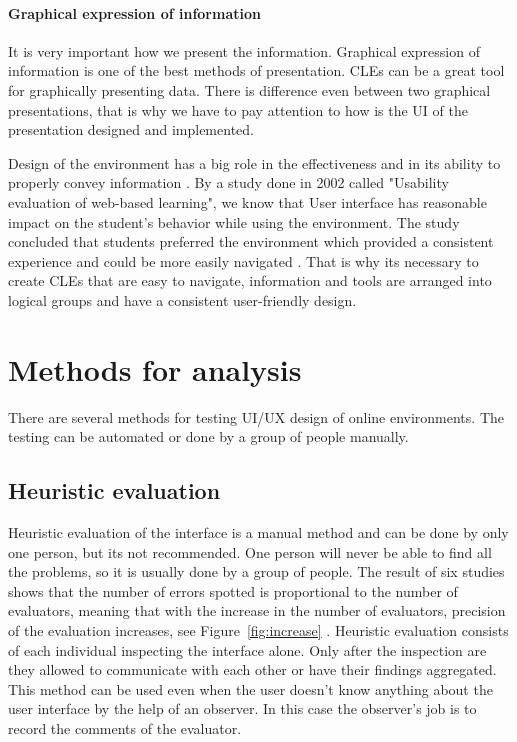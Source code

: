 \documentclass[10pt,english,a4paper]{article}
\begin{document}
\paragraph{Graphical expression of information}
It is very important how we present the information. Graphical expression of information is one of the best methods of presentation. CLEs can be
a great tool for graphically presenting data. There is difference even between two graphical presentations,
that is why we have to pay attention to how is the UI of the presentation designed and implemented. 


Design of the environment has a big role in the effectiveness and in 
its ability to properly convey information \cite{ui/ux}. 
By a study done in 2002 called "Usability evaluation of web-based learning", we know that User interface
has reasonable impact on the student's behavior while using the environment\cite{wesson_2002_usability}.
The study concluded that students preferred the environment which provided a consistent experience and could be more easily navigated 
\cite{wesson_2002_usability}. That is why its necessary to create CLEs that are easy to navigate,
information and tools are arranged into logical groups and have a consistent user-friendly design.




\section{Methods for analysis}\label{methods}
There are several methods for testing UI/UX design of online environments. The testing 
can be automated or done by a group of people manually.

\subsection{Heuristic evaluation}
Heuristic evaluation of the interface is a manual method and can be done by only one person, but
its not recommended. One person will never be able to
find all the problems, so it is usually done by a group of people\cite{a2020_heuristic}. 
The result of six studies shows that the number of errors spotted is proportional to the number of evaluators,
meaning that with the increase in the number of evaluators, precision of the evaluation increases, see Figure~\ref{fig:increase} \cite{a2020_heuristic}.
Heuristic evaluation consists of each individual inspecting the interface alone. Only after the
inspection are they allowed to communicate with each other or have their findings aggregated\cite{a2020_heuristic}.
This method can be used even when the user doesn't know anything about the user interface by
the help of an observer. In this case the observer's job is to record the comments of the evaluator\cite{a2020_heuristic}.
\end{document}

